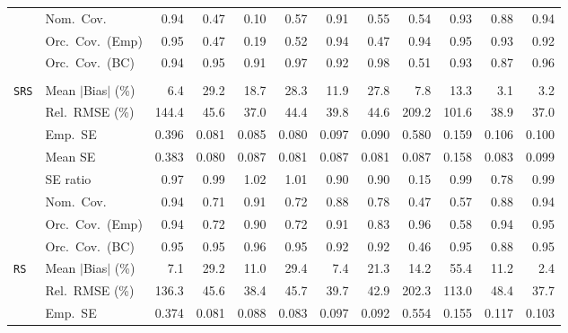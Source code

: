 \begin{landscape}
\begin{longtable}{llrrrrrrrrrr}
 & Nom.\ Cov. & \cellcolor{ranktwo}0.94 & 0.47 & 0.10 & 0.57 & 0.91 & 0.55 & 0.54 & \cellcolor{rankthree}0.93 & 0.88 & \cellcolor{rankone}0.94 \\
 & Orc.\ Cov.\ (Emp) & \cellcolor{rankone}0.95 & 0.47 & 0.19 & 0.52 & \cellcolor{rankthree}0.94 & 0.47 & 0.94 & \cellcolor{ranktwo}0.95 & 0.93 & 0.92 \\
 & Orc.\ Cov.\ (BC) & \cellcolor{ranktwo}0.94 & \cellcolor{rankone}0.95 & 0.91 & 0.97 & 0.92 & 0.98 & 0.51 & 0.93 & 0.87 & \cellcolor{rankthree}0.96 \\
\addlinespace[2pt]
\multicolumn{12}{l}{\textbf{Binary \& Categorical Phase-One Covariates}} \\
\addlinespace[2pt]
\quad \texttt{SRS} & Mean $|$Bias$|$ (\%) & \cellcolor{rankthree}6.4 & 29.2 & 18.7 & 28.3 & 11.9 & 27.8 & 7.8 & 13.3 & \cellcolor{rankone}3.1 & \cellcolor{ranktwo}3.2 \\
 & Rel.\ RMSE (\%) & 144.4 & 45.6 & \cellcolor{rankone}37.0 & 44.4 & 39.8 & 44.6 & 209.2 & 101.6 & \cellcolor{rankthree}38.9 & \cellcolor{ranktwo}37.0 \\
 & Emp.\ SE & 0.396 & 0.081 & 0.085 & 0.080 & 0.097 & 0.090 & 0.580 & 0.159 & 0.106 & 0.100 \\
 & Mean SE & 0.383 & 0.080 & 0.087 & 0.081 & 0.087 & 0.081 & 0.087 & 0.158 & 0.083 & 0.099 \\
 & SE ratio & 0.97 & \cellcolor{rankthree}0.99 & 1.02 & 1.01 & 0.90 & 0.90 & 0.15 & \cellcolor{rankone}0.99 & 0.78 & \cellcolor{ranktwo}0.99 \\
 & Nom.\ Cov. & \cellcolor{rankone}0.94 & 0.71 & \cellcolor{rankthree}0.91 & 0.72 & 0.88 & 0.78 & 0.47 & 0.57 & 0.88 & \cellcolor{ranktwo}0.94 \\
 & Orc.\ Cov.\ (Emp) & 0.94 & 0.72 & 0.90 & 0.72 & 0.91 & 0.83 & \cellcolor{ranktwo}0.96 & 0.58 & \cellcolor{rankthree}0.94 & \cellcolor{rankone}0.95 \\
 & Orc.\ Cov.\ (BC) & 0.95 & \cellcolor{rankone}0.95 & 0.96 & \cellcolor{ranktwo}0.95 & 0.92 & 0.92 & 0.46 & \cellcolor{rankthree}0.95 & 0.88 & 0.95 \\
\addlinespace[2pt]
\quad \texttt{RS} & Mean $|$Bias$|$ (\%) & \cellcolor{ranktwo}7.1 & 29.2 & 11.0 & 29.4 & \cellcolor{rankthree}7.4 & 21.3 & 14.2 & 55.4 & 11.2 & \cellcolor{rankone}2.4 \\
 & Rel.\ RMSE (\%) & 136.3 & 45.6 & \cellcolor{ranktwo}38.4 & 45.7 & \cellcolor{rankthree}39.7 & 42.9 & 202.3 & 113.0 & 48.4 & \cellcolor{rankone}37.7 \\
 & Emp.\ SE & 0.374 & 0.081 & 0.088 & 0.083 & 0.097 & 0.092 & 0.554 & 0.155 & 0.117 & 0.103 \\

\end{longtable}
\end{landscape}
